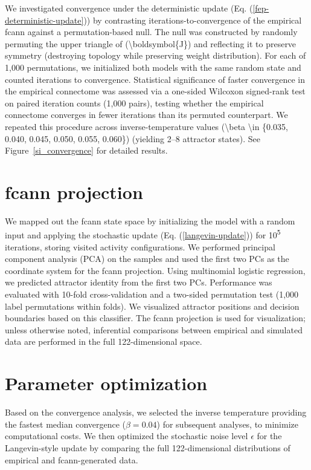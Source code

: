 \documentclass{article}
\begin{document}
We investigated convergence under the deterministic update (Eq. (\ref{fep-deterministic-update})) by contrasting iterations-to-convergence of the empirical \acrshort{fcann} against a permutation-based null. The null was constructed by randomly permuting the upper triangle of ({\textbackslash}boldsymbol\{J\}) and reflecting it to preserve symmetry (destroying topology while preserving weight distribution). For each of 1,000 permutations, we initialized both models with the same random state and counted iterations to convergence. Statistical significance of faster convergence in the empirical connectome was assessed via a one-sided Wilcoxon signed-rank test on paired iteration counts (1,000 pairs), testing whether the empirical connectome converges in fewer iterations than its permuted counterpart. We repeated this procedure across inverse-temperature values ({\textbackslash}beta {\textbackslash}in \{0.035, 0.040, 0.045, 0.050, 0.055, 0.060\}) (yielding 2--8 attractor states). See Figure~\ref{si_convergence} for detailed results.

\section{\acrshort{fcann} projection}

We mapped out the \acrshort{fcann} state space by initializing the model with a random input and applying the stochastic update (Eq. (\ref{langevin-update})) for 10\textsuperscript{5} iterations, storing visited activity configurations. We performed principal component analysis (PCA) on the samples and used the first two PCs as the coordinate system for the \acrshort{fcann} projection. Using multinomial logistic regression, we predicted attractor identity from the first two PCs. Performance was evaluated with 10-fold cross-validation and a two-sided permutation test (1,000 label permutations within folds). We visualized attractor positions and decision boundaries based on this classifier. The \acrshort{fcann} projection is used for visualization; unless otherwise noted, inferential comparisons between empirical and simulated data are performed in the full 122-dimensional space.

\section{Parameter optimization}

Based on the convergence analysis, we selected the inverse temperature providing the fastest median convergence ($\beta = 0.04$) for subsequent analyses, to minimize computational costs. We then optimized the stochastic noise level $\epsilon$ for the Langevin-style update by comparing the full 122-dimensional distributions of empirical and \acrshort{fcann}-generated data.
\end{document}
